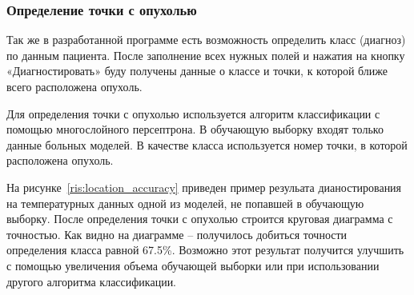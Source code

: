 \subsubsection{Определение точки с опухолью}
\par
Так же в разработанной программе есть возможность определить класс (диагноз) по данным пациента. После заполнение всех нужных полей и нажатия на кнопку «Диагностировать» буду получены данные о классе и точки, к которой ближе всего расположена опухоль. 
\par
Для определения точки с опухолью используется алгоритм классификации с помощью многослойного персептрона. В обучающую выборку входят только данные больных моделей. В качестве класса используется номер точки, в которой расположена опухоль.
\par
На рисунке~\ref{ris:location_accuracy} приведен пример резульата дианостирования на температурных данных одной из моделей, не попавшей в обучающую выборку. После определения точки с опухолью строится круговая диаграмма с точностью. 
Как видно на диаграмме -- получилось добиться точности определения класса равной 67.5\%. Возможно этот результат получится улучшить с помощью увеличения объема обучающей выборки или при использовании другого алгоритма классификации.

